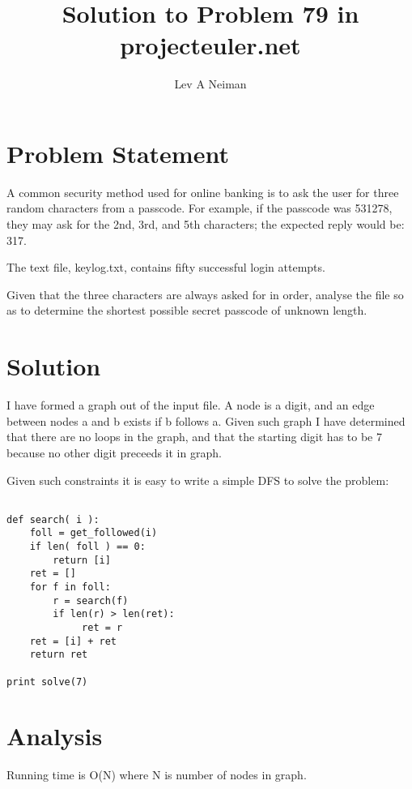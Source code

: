 \documentclass[11pt]{article}
\begin{document}
\title{Solution to Problem 79 in projecteuler.net}
\author{Lev A Neiman}

\maketitle

\section{Problem Statement}

A common security method used for online banking is to ask the user for three random characters from a passcode. For example, if the passcode was 531278, they may ask for the 2nd, 3rd, and 5th characters; the expected reply would be: 317.

The text file, keylog.txt, contains fifty successful login attempts.

Given that the three characters are always asked for in order, analyse the file so as to determine the shortest possible secret passcode of unknown length.

\section{Solution}

I have formed a graph out of the input file.  A node is a digit, and an edge between nodes a and b exists if b follows a.  Given such graph I have determined that there are no loops in the graph, and that the starting digit has to be 7 because no other digit preceeds it in graph.  

Given such constraints it is easy to write a simple DFS to solve the problem:

\begin{verbatim}

def search( i ):
    foll = get_followed(i)
    if len( foll ) == 0:
        return [i]
    ret = []
    for f in foll:
        r = search(f)
        if len(r) > len(ret):
             ret = r
    ret = [i] + ret
    return ret

print solve(7)

\end{verbatim}

\section{Analysis}

Running time is O(N) where N is number of nodes in graph.
\end{document}
